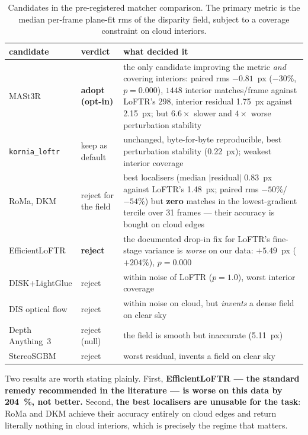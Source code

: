 \documentclass[11pt,a4paper]{article}
\begin{document}
\begin{table}[t]
\centering
\caption{Candidates in the pre-registered matcher comparison. The primary metric is the median
per-frame plane-fit rms of the disparity field, subject to a coverage constraint on cloud
interiors.}
\label{tab:matchers}
\small
\begin{tabular}{@{}llp{}@{}}
\toprule
candidate & verdict & what decided it \\
\midrule
MASt3R & \textbf{adopt (opt-in)} & the only candidate improving the metric \emph{and} covering
  interiors: paired rms $-0.81$~px ($-30\%$, $p=0.000$), $1448$ interior matches/frame against
  LoFTR's $298$, interior residual \SI{1.75}{px} against \SI{2.15}{px}; but $6.6\times$ slower
  and $4\times$ worse perturbation stability \\
\texttt{kornia\_loftr} & keep as default & unchanged, byte-for-byte reproducible, best
  perturbation stability (\SI{0.22}{px}); weakest interior coverage \\
RoMa, DKM & reject for the field & best localisers (median $|$residual$|$ \SI{0.83}{px} against
  LoFTR's \SI{1.48}{px}; paired rms $-50\%$/$-54\%$) but \textbf{zero} matches in the
  lowest-gradient tercile over 31 frames --- their accuracy is bought on cloud edges \\
EfficientLoFTR & \textbf{reject} & the documented drop-in fix for LoFTR's fine-stage variance
  is \emph{worse} on our data: $+5.49$~px ($+204\%$), $p=0.000$ \\
DISK+LightGlue & reject & within noise of LoFTR ($p=1.0$), worst interior coverage \\
DIS optical flow & reject & within noise on cloud, but \emph{invents} a dense field on clear sky \\
Depth Anything~3 & reject (null) & the field is smooth but inaccurate (\SI{5.11}{px}) \\
StereoSGBM & reject & worst residual, invents a field on clear sky \\
\bottomrule
\end{tabular}
\end{table}

\noindent
Two results are worth stating plainly. First, \textbf{EfficientLoFTR --- the standard remedy
recommended in the literature --- is worse on this data by \SI{204}{\percent}, not better.}
Second, \textbf{the best localisers are unusable for the task}: RoMa and DKM achieve their
accuracy entirely on cloud edges and return literally nothing in cloud interiors, which is
precisely the regime that matters.
\end{document}
